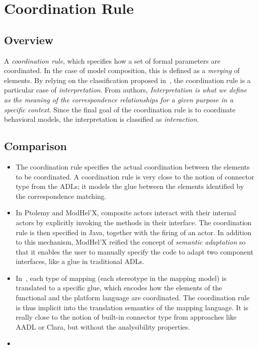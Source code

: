 \section{Coordination Rule}
\subsection{Overview}
A \emph{coordination rule}, which specifies how a set of formal parameters are coordinated. In the case of model composition, this is defined as a \emph{merging} of elements. By relying on the classification proposed in~\cite{clavreulmodelcompo}, the coordination rule is a particular case of \emph{interpretation}. From authors, \emph{Interpretation is what we define as the meaning of the correspondence relationships for a given purpose in a specific context}. Since the final goal of the coordination rule is to coordinate behavioral models, the interpretation is classified as \emph{interaction}.
\subsection{Comparison}
		\begin{itemize}
			\item The coordination rule specifies the actual coordination between the elements to be coordinated. A coordination rule is very close to the notion of connector type from the ADLs; it models the glue between the elements identified by the correspondence matching.
			
			\item In Ptolemy and ModHel'X, composite actors interact with their internal actors by explicitly invoking the methods in their interface. The coordination rule is then specified in Java, together with the firing of an actor. In addition to this mechanism, ModHel'X reified the concept of \emph{semantic adaptation} so that it enables the user to manually specify the code to adapt two component interfaces, like a glue in traditional ADLs.
			
			\item In~\cite{dinatale}, each type of mapping (\ie each stereotype in the mapping model) is translated to a specific glue, which encodes how the elements of the functional and the platform language are coordinated. The coordination rule is thus implicit into the translation semantics of the mapping language. It is really close to the notion of built-in connector type from approaches like AADL or Clara, but without the analysibility properties.        
			
			\item {}  
		\end{itemize}
		

